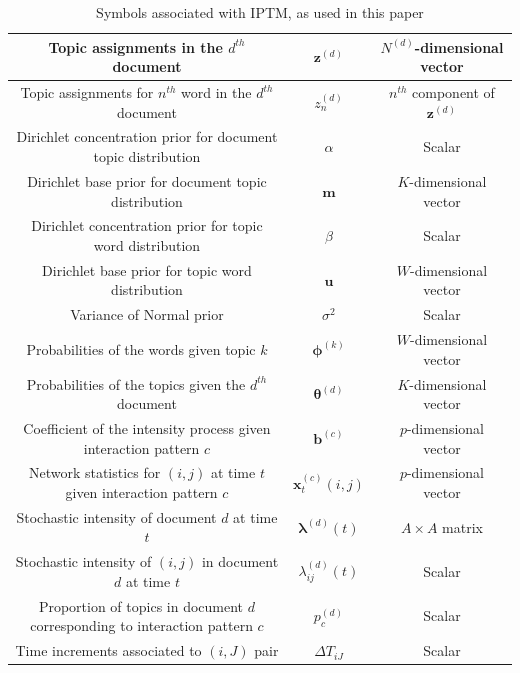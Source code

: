 \documentclass[a4paper]{article}
\begin{document}
\begin{table}[ht]
{\begin{tabular}{ |c|c|c|}
  			\hline 	
  			Topic assignments in the $d^{th}$ document&$\boldsymbol{z}^{(d)}$ & $N^{(d)}$-dimensional vector\\
  			\hline 
  			Topic assignments for $n^{th}$ word in the $d^{th}$ document&${z}_n^{(d)}$ & $n^{th}$ component of $\boldsymbol{z}^{(d)}$\\
  			\hline 	
  			Dirichlet concentration prior for document topic distribution&$\alpha$ & Scalar \\
  			\hline	
  			Dirichlet base prior for document topic distribution&$\boldsymbol{m}$ & $K$-dimensional vector \\
  			\hline			
  			Dirichlet concentration prior for topic word distribution&$\beta$ & Scalar \\
  			\hline			 
  			Dirichlet base prior for topic word distribution&$\boldsymbol{u}$ & $W$-dimensional vector  \\
  			\hline				 	
  			Variance of Normal prior&$\sigma^2$ & Scalar \\
  			\hline		
  			Probabilities of the words given topic $k$ &$\boldsymbol{\phi}^{(k)}$ & $W$-dimensional vector\\
  			\hline
  			Probabilities of the topics given the $d^{th}$ document &$\boldsymbol{\theta}^{(d)}$ & $K$-dimensional vector\\
  			\hline		
  			Coefficient of the intensity process given interaction pattern $c$ &$\boldsymbol{b}^{(c)}$ & $p$-dimensional vector\\
  			\hline		
  			Network statistics for $(i, j)$ at time $t$ given interaction pattern $c$ &$\boldsymbol{x}^{(c)}_t{(i,j)}$ & $p$-dimensional vector\\
  			\hline		
  			Stochastic intensity of document $d$ at time $t$ & $\boldsymbol{\lambda}^{(d)}(t)$ & $A\times A$ matrix\\
  			\hline
  		  	Stochastic intensity of $(i, j)$ in document $d$ at time $t$ & ${\lambda}_{ij}^{(d)}(t)$ & Scalar\\
  		  	\hline	
  		  	  		  	Proportion of topics in document $d$ corresponding to interaction pattern $c$ & $p_c^{(d)}$ & Scalar\\
  		  	  		  	\hline
  		  Time increments associated to $(i, J)$ pair & $\Delta T_{iJ}$ & Scalar\\
  		  		\hline
  			\hline
  		\end{tabular}}
  		\caption {Symbols associated with IPTM, as used in this paper}
  		\label{table:SymbolsIPTM}
  	\end{table}
  	\normalsize
  	\fi
\end{document}
